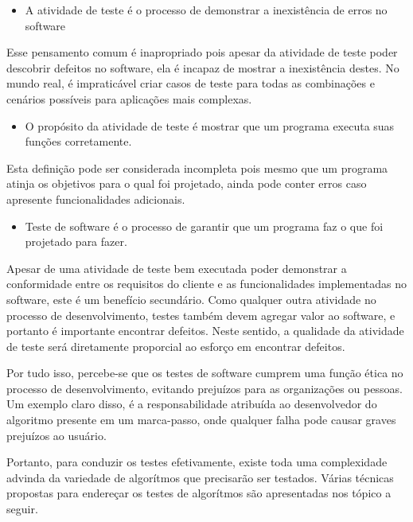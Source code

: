 \begin{itemize}
\item A atividade de teste é o processo de demonstrar a inexistência de erros no software
\end{itemize}

Esse pensamento comum é inapropriado pois apesar da atividade de teste poder descobrir defeitos no software, ela é incapaz de mostrar a inexistência destes. No mundo real, é impraticável criar casos de teste para todas as combinações e cenários possíveis para aplicações mais complexas.

\begin{itemize}
\item O propósito da atividade de teste é mostrar que um programa executa suas funções corretamente.
\end{itemize}

Esta definição pode ser considerada incompleta pois mesmo que um programa atinja os objetivos para o qual foi projetado, ainda pode conter erros caso apresente funcionalidades adicionais.

\begin{itemize}
\item Teste de software é o processo de garantir que um programa faz o que foi projetado para fazer.
\end{itemize}

Apesar de uma atividade de teste bem executada poder demonstrar a conformidade entre os requisitos do cliente e as funcionalidades implementadas no software, este é um benefício secundário. Como qualquer outra atividade no processo de desenvolvimento, testes também devem agregar valor ao software, e portanto é importante encontrar defeitos. Neste sentido, a qualidade da atividade de teste será diretamente proporcial ao esforço em encontrar defeitos.

Por tudo isso, percebe-se que os testes de software cumprem uma função ética no processo de desenvolvimento, evitando prejuízos para as organizações ou pessoas. Um exemplo claro disso, é a responsabilidade atribuída ao desenvolvedor do algoritmo presente em um marca-passo, onde qualquer falha pode causar graves prejuízos ao usuário.

Portanto, para conduzir os testes efetivamente, existe toda uma complexidade advinda da variedade de algorítmos que precisarão ser testados. Várias técnicas propostas para endereçar os testes de algorítmos são apresentadas nos tópico a seguir.